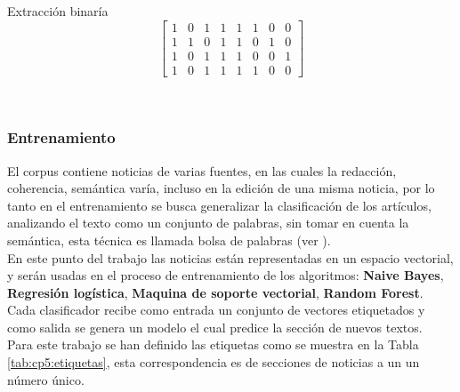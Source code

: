 \begin{mygraybox}[label={box:cp5:binario}]{Extracción binaría} 
\begin{equation*}
\begin{bmatrix}
1 & 0 & 1 & 1 & 1 & 1 & 0 & 0\\
1 & 1 & 0 & 1 & 1 & 0 & 1 & 0\\
1 & 0 & 1 & 1 & 1 & 0 & 0 & 1\\
1 & 0 & 1 & 1 & 1 & 1 & 0 & 0 
\end{bmatrix}
\end{equation*}
\end{mygraybox}

\ \\

\subsubsection{Entrenamiento}


El corpus contiene noticias de varias fuentes, en  las cuales la redacción, coherencia, semántica varía, incluso en la edición de una misma noticia, por lo tanto en el entrenamiento se busca generalizar la clasificación de los artículos, analizando el texto como un conjunto de palabras, sin tomar en cuenta la semántica, esta técnica es llamada bolsa de palabras (ver ).\\

En este punto del trabajo las noticias están representadas en un espacio vectorial, y serán usadas en el proceso de entrenamiento de los algoritmos: \textbf{Naive Bayes}, \textbf{Regresión logística}, \textbf{Maquina de soporte vectorial}, \textbf{Random Forest}. Cada clasificador recibe como entrada un conjunto de vectores etiquetados y como salida se genera un modelo el cual predice la sección de nuevos textos.\\ 

Para este trabajo se han definido las etiquetas como se muestra en la Tabla \ref{tab:cp5:etiquetas}, esta correspondencia es de secciones de noticias a un un número único.


